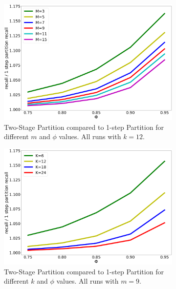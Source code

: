 \documentclass[letterpaper]{article} %
\begin{document}
\begin{figure}
\centering
\begin{subfigure}{0.24\textwidth}
\includegraphics[width=\textwidth]{"./images/recall_compare_1_step_partition_with_phi_new_new.png"}
\caption{Two-Stage Partition compared to 1-step Partition for different $m$ and $\phi$ values. All runs with $k = 12$.}
\label{fig:recall-performance}
\end{subfigure}%
\hfill
\begin{subfigure}{0.24\textwidth}
\includegraphics[width=\textwidth]{"./images/recall_compare_1_step_partition_reviews_with_phi_new_new.png"}
\caption{Two-Stage Partition compared to 1-step Partition for different $k$ and $\phi$ values. All runs with $m = 9$.}
\label{fig:recall-performance-reviews}
\end{subfigure}
\hfill
\begin{subfigure}{0.24\textwidth}

\end{subfigure}
\end{figure}
\end{document}

